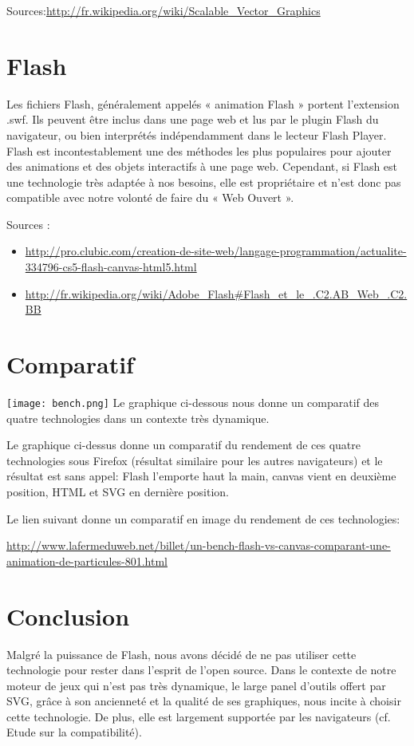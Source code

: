\documentclass[a4paper,10pt]{report}
\begin{document}
Sources:\url{http://fr.wikipedia.org/wiki/Scalable_Vector_Graphics}

\section{Flash}
Les fichiers Flash, généralement appelés « animation Flash » portent l'extension .swf. 
Ils peuvent être inclus dans une page web et lus par le plugin Flash du navigateur, ou 
bien interprétés indépendamment dans le lecteur Flash Player. Flash est incontestablement 
une des méthodes les plus populaires pour ajouter des animations et des objets
 interactifs à une page web. 
Cependant, si Flash est une technologie très adaptée à nos besoins, elle est propriétaire
 et n'est donc pas compatible avec notre volonté de faire du « Web Ouvert ».
 
Sources : 
\begin{itemize}
\item  \url{http://pro.clubic.com/creation-de-site-web/langage-programmation/actualite-334796-cs5-flash-canvas-html5.html}
\item \url{http://fr.wikipedia.org/wiki/Adobe_Flash#Flash_et_le_.C2.AB_Web_.C2.BB}
\end{itemize}

\section{Comparatif}
\texttt{[image: bench.png]}
Le graphique ci-dessous nous donne un comparatif des quatre technologies dans 
un contexte très dynamique.
 
Le graphique ci-dessus donne un comparatif du rendement de ces quatre technologies sous 
Firefox (résultat similaire pour les autres navigateurs) et le résultat est sans appel: 
Flash l'emporte haut la main, canvas vient en deuxième position, HTML et SVG en dernière 
position.

  

Le lien suivant donne un comparatif en image du rendement de ces technologies:
 
\url{http://www.lafermeduweb.net/billet/un-bench-flash-vs-canvas-comparant-une-animation-de-particules-801.html}

\section{Conclusion}
Malgré la puissance de Flash, nous avons décidé de ne pas utiliser cette 
technologie pour rester dans l'esprit de l'open source.
Dans le contexte de notre moteur de jeux qui n'est pas très dynamique, le large panel 
d'outils offert par SVG, grâce à son ancienneté et la qualité de ses graphiques,
 nous incite à choisir cette technologie. De plus, elle est largement supportée par les navigateurs
 (cf. Etude sur la compatibilité). 
\end{document}
